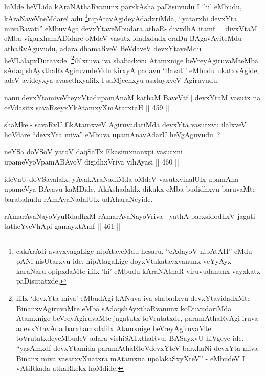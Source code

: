 \begin{artha}
hiMde heVLida kAraNAthaRvanunx parxkAsha paDisuvudu I `hi' eMbudu,
kAraNaveVneMdare! adu \footnote[1]{cakArAdi avayxyagaLige nipAtaveMdu
  hesaru, ``cAdayoV nipAtAH'' eMdu pANi nisUtarxvu ide, nipAtagaLige
  doyxVtakatavxvanunx veYyAyx karaNaru opipxdaMte ililx `hi' eMbudu
  kAraNAthaR viruvudanunx vayxkatx paDisutatxde,}nipAtavAgideyAdadxriMda,
``yatarxhi devxYta mivaBavati'' eMbuvAga devxYtaveMbudara athaR-
divxdhA itamf = divxVtaM eMba vigarxhamADidare oMdeV vasutx idadxdudx
eraDu BAgavAyiteMdu athaRvAguvudu, adara dhamaRveV BeVdaveV
devxYtaveMdu heVLalapxDutatxde. \footnote[2]{ililx `devxYta miva'
eMbudAgi kANuva iva shabadxvu devxYtavidadxMte BinanxvAgiruvaMte eMba
sAdaqshAyxthaRvanunx koDuvudariMda Atamxnige beVreyAgiruvaMte jagatutx
toVrutatxde, paramAthaRvAgi iruva adevxYtavAda barxhamxdalilx
Atamxnige beVreyAgiruvaMte toVrutatxdeyeMbudeV adara vishiSATxthaRvu,
BASayxvU hiVgeye ide. ``yasAmxdf devxYtamida paramAthaRtoV\s devxYteV
barxhaNi devxYta miva Binanx miva vasatxvXnatxra mAtamxna
upalakaSxyXteV'' - eMbudeV I vAtiRkada athaRkekx hoMdide.}ililxruva iva shabadxvu
Atamxnige beVreyAgiruvaMteMba sAdaq shAyxthaRvAgiruvudeMdu kirxyA
padavu `Bavati' eMbudu ukatxvAgide, adeV avideyxya avasethxyalilx I
saMjecnxyu asatayxveV Agiruvudu.
\end{artha}

\begin{shl}
nanu devxYtamiveVteyxVtadupamAnaM kathaM BaveVtf |
devxYtaM vasutx na ceVdasitx savaRseyxYkAtamxyXmAtarxtaH \hfill  || 459 ||
\end{shl}

\begin{artha}
shaMke - savaRvU EkAtamxveV AgiruvadariMda devxYta vasutxvu ilalxveV hoVdare ``devxYta miva'' eMbuva upamAnavAdarU heVgAguvudu~?
\end{artha}


\begin{shl}
neYSa doVSoV yatoV daqSaTx Ekasimxnanxpi vasutxni |
upameVyoVpamABAvoV digidhxVriva vihAyasi \hfill  || 460 ||
\end{shl}

\begin{artha}
ideVnU doVSavalalx, yAvakAraNadiMda oMdeV vasutxvinalUlx upamAna -
upameVya BAvavu kaMDide, AkAshadalilx dikukx eMba budidhxyu baruvaMte
barabahudu rAmAyaNadalUlx udAharaNeyide.
\end{artha}

\begin{shl}
rAmarAvaNayoVyuRdadhxM rAmarAvaNayoVriva |
yathA parxsidodhxV jagati tatheYveVhApi gamayxtAmf \hfill  || 461 ||
\end{shl}

